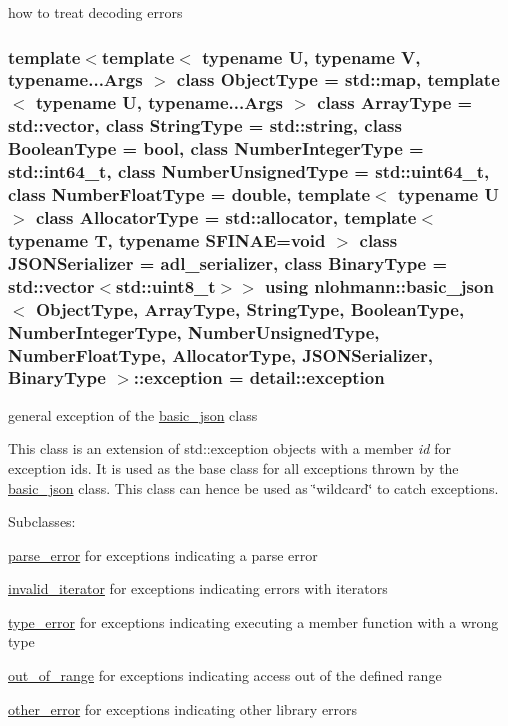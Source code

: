 how to treat decoding errors 

\subsubsection[{\texorpdfstring{exception}{exception}}]{\setlength{\rightskip}{0pt plus 5cm}template$<$template$<$ typename U, typename V, typename...\+Args $>$ class Object\+Type = std\+::map, template$<$ typename U, typename...\+Args $>$ class Array\+Type = std\+::vector, class String\+Type  = std\+::string, class Boolean\+Type  = bool, class Number\+Integer\+Type  = std\+::int64\+\_\+t, class Number\+Unsigned\+Type  = std\+::uint64\+\_\+t, class Number\+Float\+Type  = double, template$<$ typename U $>$ class Allocator\+Type = std\+::allocator, template$<$ typename T, typename S\+F\+I\+N\+A\+E=void $>$ class J\+S\+O\+N\+Serializer = adl\+\_\+serializer, class Binary\+Type  = std\+::vector$<$std\+::uint8\+\_\+t$>$$>$ using {\bf nlohmann\+::basic\+\_\+json}$<$ Object\+Type, Array\+Type, String\+Type, Boolean\+Type, Number\+Integer\+Type, Number\+Unsigned\+Type, Number\+Float\+Type, Allocator\+Type, J\+S\+O\+N\+Serializer, Binary\+Type $>$\+::{\bf exception} =  {\bf detail\+::exception}}\hypertarget{classnlohmann_1_1basic__json_a14824c27188d2fee4861806cd5f23d22}{}\label{classnlohmann_1_1basic__json_a14824c27188d2fee4861806cd5f23d22}


general exception of the \hyperlink{classnlohmann_1_1basic__json}{basic\+\_\+json} class 

This class is an extension of {\ttfamily std\+::exception} objects with a member {\itshape id} for exception ids. It is used as the base class for all exceptions thrown by the \hyperlink{classnlohmann_1_1basic__json}{basic\+\_\+json} class. This class can hence be used as \char`\"{}wildcard\char`\"{} to catch exceptions.

Subclasses\+:
\begin{DoxyItemize}
\item \hyperlink{classnlohmann_1_1basic__json_a555b05e9da63d486126759922685a37a}{parse\+\_\+error} for exceptions indicating a parse error
\item \hyperlink{classnlohmann_1_1basic__json_a6ccc9788413fd58de998fe92743cb4aa}{invalid\+\_\+iterator} for exceptions indicating errors with iterators
\item \hyperlink{classnlohmann_1_1basic__json_ace5bf851eafe85bd6332f978991bc11c}{type\+\_\+error} for exceptions indicating executing a member function with a wrong type
\item \hyperlink{classnlohmann_1_1basic__json_a2251d8523fa6d16c0fba6388ffa2ef8c}{out\+\_\+of\+\_\+range} for exceptions indicating access out of the defined range
\item \hyperlink{classnlohmann_1_1basic__json_a6fc373c99facc37aadbc5651b3d6631d}{other\+\_\+error} for exceptions indicating other library errors
\end{DoxyItemize}

